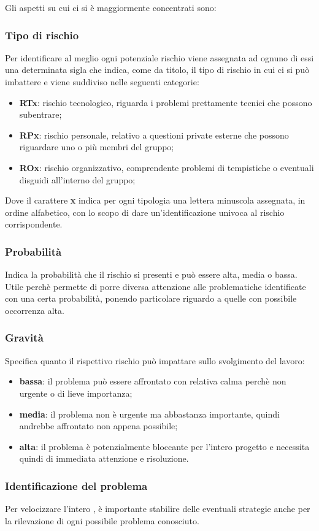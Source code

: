 Gli aspetti su cui ci si è maggiormente concentrati sono:

\subsubsection{Tipo di rischio}
    Per identificare al meglio ogni potenziale rischio viene assegnata ad ognuno di essi una determinata sigla che indica, come da titolo, il tipo di rischio in cui ci si può imbattere e viene suddiviso nelle seguenti categorie:
    \begin{itemize}
        \item \textbf{RTx}: rischio tecnologico, riguarda i problemi prettamente tecnici che possono subentrare;
        \item \textbf{RPx}: rischio personale, relativo a questioni private esterne che possono riguardare uno o più membri del gruppo;
        \item \textbf{ROx}: rischio organizzativo, comprendente problemi di tempistiche o eventuali disguidi all'interno del gruppo;
    \end{itemize}
    Dove il carattere \textbf{x} indica per ogni tipologia una lettera minuscola assegnata, in ordine alfabetico, con lo scopo di dare un'identificazione univoca al rischio corrispondente.
    
\subsubsection{Probabilità}
    Indica la probabilità che il rischio si presenti e può essere alta, media o bassa. Utile perchè permette di porre diversa attenzione alle problematiche identificate con una certa probabilità, ponendo particolare riguardo a quelle con possibile occorrenza alta.

\subsubsection{Gravità}
    Specifica quanto il rispettivo rischio può impattare sullo svolgimento del lavoro:
    \begin{itemize}
        \item \textbf{bassa}: il problema può essere affrontato con relativa calma perchè non urgente o di lieve importanza;
        \item \textbf{media}: il problema non è urgente ma abbastanza importante, quindi andrebbe affrontato non appena possibile;
        \item \textbf{alta}: il problema è potenzialmente bloccante per l'intero progetto e necessita quindi di immediata attenzione e risoluzione.
    \end{itemize}
    
\subsubsection{Identificazione del problema}
    Per velocizzare l'intero , è importante stabilire delle eventuali strategie anche per la rilevazione di ogni possibile problema conosciuto.